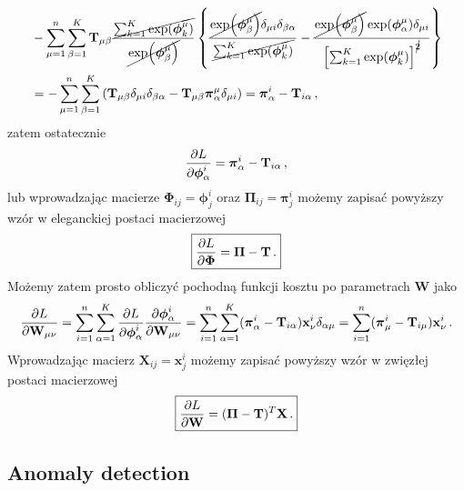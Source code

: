 \documentclass{myclass}
\numberwithin{equation}{section}
\begin{document}
\begin{equation}
    \begin{split}
        &-\sum_{\mu=1}^n\sum_{\beta=1}^K \mathbf{T}_{\mu\beta} \frac{\cancel{\sum_{k=1}^K \exp(\boldsymbol{\phi}^\mu_k)}}{\cancel{\exp(\boldsymbol{\phi}^\mu_\beta)}} \left\{\frac{\cancel{\exp(\boldsymbol{\phi}_\beta^\mu)}\delta_{\mu i}\delta_{\beta \alpha}}{\cancel{\sum_{k=1}^K \exp(\boldsymbol{\phi}_k^\mu)}} - \frac{\cancel{\exp(\boldsymbol{\phi}_\beta^\mu)} \exp(\boldsymbol{\phi}^\mu_\alpha) \delta_{\mu i}}{\left[\sum_{k=1}^K \exp(\boldsymbol{\phi}_k^\mu)\right]^{\cancel{2}}}\right\}\\
        &= -\sum_{\mu=1}^n\sum_{\beta=1}^K \left(\mathbf{T}_{\mu\beta} \delta_{\mu i}\delta_{\beta\alpha} - \mathbf{T}_{\mu\beta}\boldsymbol{\pi}^\mu_\alpha\delta_{\mu i}\right) = \boldsymbol{\pi}_\alpha^i - \mathbf{T}_{i\alpha}\,,
    \end{split}
\end{equation}
zatem ostatecznie
\begin{equation}
    \pdv{L}{\boldsymbol{\phi}_\alpha^i} = \boldsymbol{\pi}_\alpha^i - \mathbf{T}_{i\alpha}\,,
\end{equation}
lub wprowadzając macierze \(\boldsymbol{\Phi}_{ij} = \boldsymbol{\phi}^i_j\) oraz
\(\boldsymbol{\Pi}_{ij} = \boldsymbol{\pi}^i_j\) możemy zapisać powyższy wzór w eleganckiej postaci
macierzowej
\begin{equation}\boxed{
    \pdv{L}{\boldsymbol{\Phi}} = \boldsymbol{\Pi} - \mathbf{T}\,.
}\end{equation}
Możemy zatem prosto obliczyć pochodną funkcji kosztu po parametrach \(\mathbf{W}\) jako
\begin{equation}
    \pdv{L}{\mathbf{W}_{\mu\nu}} = \sum_{i=1}^n \sum_{\alpha=1}^{K} \pdv{L}{\boldsymbol{\phi}_\alpha^i}\pdv{\boldsymbol{\phi}_\alpha^i}{\mathbf{W}_{\mu\nu}} = \sum_{i=1}^n \sum_{\alpha=1}^{K} (\boldsymbol{\pi}_\alpha^i - \mathbf{T}_{i\alpha}) \mathbf{x}^i_\nu \delta_{\alpha \mu} = \sum_{i=1}^n (\boldsymbol{\pi}_\mu^i - \mathbf{T}_{i\mu})\mathbf{x}^i_\nu\,.
\end{equation}
Wprowadzając macierz \(\mathbf{X}_{ij} = \mathbf{x}^i_j\) możemy zapisać powyższy wzór w zwięzłej
postaci macierzowej
\begin{equation}\boxed{
    \pdv{L}{\mathbf{W}} = (\boldsymbol{\Pi} - \mathbf{T})^T \mathbf{X}\,.
}\end{equation}


\subsection{Anomaly detection}
\end{document}
